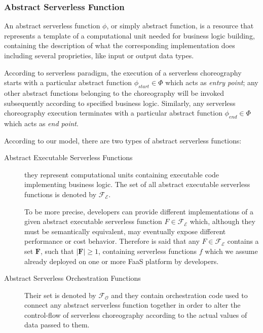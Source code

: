 \subsubsection{Abstract Serverless Function}

An abstract serverless function $\phi$, or simply abstract function, is a resource that represents a template of a computational unit needed for business logic building, containing the description of what the corresponding implementation does including several proprieties, like input or output data types.

According to serverless paradigm, the execution of a serverless choreography starts with a particular abstract function $\phi_{start} \in \Phi$ which acts as \textit{entry point}; any other abstract functions belonging to the choreography will be invoked subsequently according to specified business logic. Similarly, any serverless choreography execution terminates with a particular abstract function $\phi_{end} \in \Phi$ which acts as \textit{end point}.

According to our model, there are two types of abstract serverless functions:

\begin{description}
	
	\item[Abstract Executable Serverless Functions] they represent computational units containing executable code implementing business logic. The set of all abstract executable serverless functions is denoted by $\mathscr{F_E}$.
	
	To be more precise, developers can provide different implementations of a given abstract executable serverless function $F \in \mathscr{F_E}$ which, although they must be semantically equivalent, may eventually expose different performance or cost behavior. Therefore is said that any $F \in \mathscr{F_E}$ contains a set $\textbf{F}$, such that $|\textbf{F}| \geq 1 $, containing serverless functions $f$ which we assume already deployed on one or more FaaS platform by developers.
	
	\item[Abstract Serverless Orchestration Functions] Their set is denoted by $\mathscr{F_O}$ and they contain orchestration code used to connect any abstract serverless function together in order to alter the control-flow of serverless choreography according to the actual values of data passed to them.
	
\end{description}

